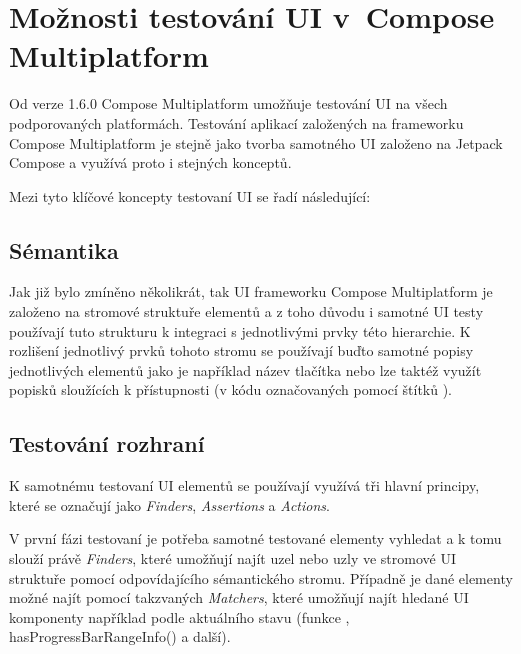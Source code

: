 

\section{Možnosti testování UI v~Compose Multiplatform}
Od verze 1.6.0 Compose Multiplatform umožňuje testování UI na všech podporovaných platformách. \cite{composeNews1.6.0}
Testování aplikací založených na frameworku Compose Multiplatform je stejně jako tvorba samotného UI založeno na Jetpack Compose a využívá 
proto i stejných konceptů. 

\bigskip

Mezi tyto klíčové koncepty testovaní UI se řadí následující:


\subsection*{Sémantika}
Jak již bylo zmíněno několikrát, tak UI frameworku Compose Multiplatform je založeno na stromové struktuře elementů a z toho důvodu 
i samotné UI testy používají tuto strukturu k integraci s jednotlivými prvky této hierarchie. K rozlišení jednotlivý prvků tohoto 
stromu se používají buďto samotné popisy jednotlivých elementů jako je například název tlačítka nebo lze taktéž využít popisků
sloužících k přístupnosti (v kódu označovaných pomocí štítků ).


\subsection*{Testování rozhraní}
K samotnému testovaní UI elementů se používají využívá tři hlavní principy, které se
označují jako \textit{Finders}, \textit{Assertions} a \textit{Actions}.

V první fázi testovaní je potřeba samotné testované elementy vyhledat a k tomu slouží právě \textit{Finders}, které  umožňují najít
 uzel nebo uzly ve stromové UI struktuře pomocí odpovídajícího sémantického stromu. Případně je dané elementy možné najít
pomocí takzvaných \textit{Matchers}, které umožňují najít hledané UI komponenty například podle aktuálního stavu 
(funkce , hasProgressBarRangeInfo() a další).

